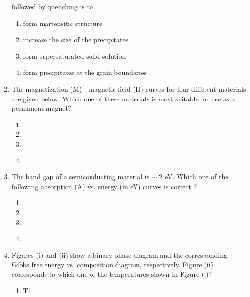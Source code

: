 \documentclass[journal]{IEEEtran}
\begin{document}
\begin{enumerate}
followed by quenching is to
\begin{enumerate}
    \item form martensitic structure
    \item increase the size of the precipitates
    \item form supersaturated solid solution
    \item form precipitates at the grain boundaries \\
\end{enumerate}
\item The magnetization (M) - magnetic field (H) curves for four different materials are given below. Which one of these materials is most suitable for use as a permanent magnet?
\begin{enumerate}
    \item \resizebox{0.4\textwidth}{!}{%

}%
\item \resizebox{0.4\textwidth}{!}{%

}%
\item \resizebox{0.4\textwidth}{!}{%

}%
\item \resizebox{0.4\textwidth}{!}{%

}%
\\
\end{enumerate}
\item The band gap of a semiconducting material is $\sim$ 2 eV. Which one of the following absorption (A) vs. energy (in eV) curves is correct ?
\begin{enumerate}
    \item \resizebox{0.4\textwidth}{!}{%

}%
\item \resizebox{0.4\textwidth}{!}{%

}%
\item \resizebox{0.4\textwidth}{!}{%

}%
\item \resizebox{0.4\textwidth}{!}{%

}%
\\
\end{enumerate}
\item Figures (i) and (ii) show a binary phase diagram and the corresponding Gibbs free energy  vs. composition  diagram, respectively. Figure (ii) corresponds to which one of the temperatures shown in Figure (i)?
\pagebreak
\begin{figure}[!ht]
\centering
\resizebox{0.9\textwidth}{!}{%

}%
\end{figure}
\begin{enumerate}
    \item T1

\end{enumerate}
\end{enumerate}
\end{document}
